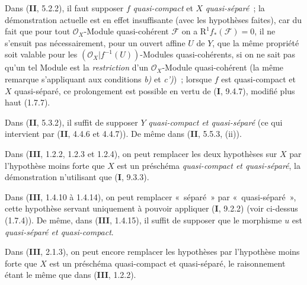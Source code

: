 \begin{env}[1.7.18]
\label{IV.1.7.18-fr}
Dans (\textbf{II}, 5.2.2), il faut supposer $f$ \emph{quasi-compact} et $X$ \emph{quasi-séparé}~; la
démonstration actuelle est en effet insuffisante (avec les hypothèses faites),
car du fait que pour tout $\mathcal O_X$-Module quasi-cohérent $\mathscr F$ on
a $\mathrm R^1f_*(\mathscr F)=0$, il ne s'ensuit pas nécessairement, pour un
ouvert affine $U$ de $Y$, que la même propriété soit valable pour les
$(\mathcal O_X|f^{-1}(U))$-Modules quasi-cohérents, si on ne sait pas qu'un tel
Module est la \emph{restriction} d'un $\mathcal O_X$-Module quasi-cohérent (la
même remarque s'appliquant aux conditions \emph{b)} et \emph{c')})~; lorsque $f$ est
quasi-compact et $X$ quasi-séparé, ce prolongement est possible en vertu de
(\textbf{I}, 9.4.7), modifié plus haut (1.7.7).
\end{env}

\begin{env}[1.7.19]
\label{IV.1.7.19-fr}
Dans (\textbf{II}, 5.3.2), il suffit de supposer $Y$ \emph{quasi-compact et
quasi-séparé} (ce qui intervient par (\textbf{II}, 4.4.6 et 4.4.7)). De même dans (\textbf{II},
5.5.3, (ii)).
\end{env}

\begin{env}[1.7.20]
\label{IV.1.7.20-fr}
Dans (\textbf{III}, 1.2.2, 1.2.3 et 1.2.4), on peut remplacer les deux hypothèses sur
$X$ par l'hypothèse moins forte que $X$ est un préschéma \emph{quasi-compact
et quasi-séparé}, la démonstration n'utilisant que (\textbf{I}, 9.3.3).
\end{env}

\begin{env}[1.7.21]
\label{IV.1.7.21-fr}
Dans (\textbf{III}, 1.4.10 à 1.4.14), on peut remplacer «~séparé~» par
«~quasi-séparé~», cette hypothèse servant uniquement à pouvoir appliquer (\textbf{I},
9.2.2) (voir ci-dessus (1.7.4)). De même, dans (\textbf{III}, 1.4.15), il suffit de
supposer que le morphisme $u$ est \emph{quasi-séparé et quasi-compact}.
\end{env}

\begin{env}[1.7.22]
\label{IV.1.7.22-fr}
Dans (\textbf{III}, 2.1.3), on peut encore remplacer les hypothèses par l'hypothèse
moins forte que $X$ est un préschéma quasi-compact et quasi-séparé, le
raisonnement étant le même que dans (\textbf{III}, 1.2.2).
\end{env}

